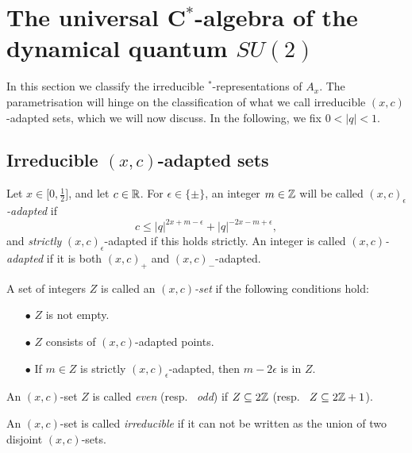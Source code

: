 



\section{The universal C$^*$-algebra of the dynamical quantum $SU(2)$}\label{SecUni}

In this section we classify the irreducible $^*$-representations of $A_x$. The parametrisation will hinge on the classification of what we call irreducible $(x,c)$-adapted sets, which we will now discuss. In the following, we fix $0<|q|<1$.

\subsection{Irreducible $(x,c)$-adapted sets}

\begin{Def}\label{DefAdapt} Let $x\in \lbrack 0,\frac{1}{2}\rbrack$, and let $c\in\mathbb{R}$. For $\epsilon \in \{\pm\}$, an integer $m\in \mathbb{Z}$ will be called \emph{$(x,c)_{\epsilon}$-adapted} if \begin{equation}\label{EqAd+}c \leq |q|^{2x+m-\epsilon}+|q|^{-2x-m+\epsilon},\end{equation} and \emph{strictly} $(x,c)_{\epsilon}$-adapted if this holds strictly. An integer is called \emph{$(x,c)$-adapted} if it is both $(x,c)_+$ and $(x,c)_-$-adapted. 

A set of integers $Z$ is called an  \emph{$(x,c)$-set} if the following conditions hold: \begin{itemize} 
\item[$\bullet$] $Z$ is not empty.
\item[$\bullet$] $Z$ consists of $(x,c)$-adapted points.
\item[$\bullet$] If $m\in Z$ is strictly $(x,c)_{\epsilon}$-adapted, then $m-2\epsilon$ is in $Z$.
\end{itemize}
An $(x,c)$-set $Z$ is called \emph{even} (resp.~ \emph{odd}) if $Z\subseteq 2\mathbb{Z}$ (resp.~ $Z\subseteq 2\mathbb{Z}+1$).

An $(x,c)$-set is called \emph{irreducible} if it can not be written as the union of two disjoint $(x,c)$-sets.
\end{Def}


